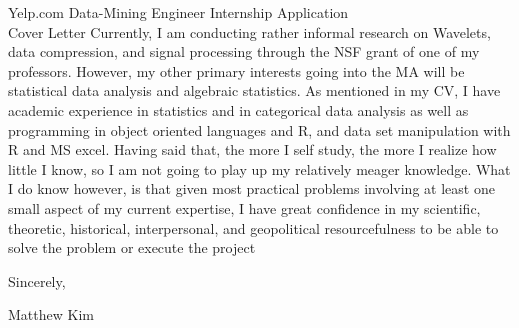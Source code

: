 \documentclass[11pt]{letter} %
\begin{document}
\begin{letter}{Yelp.com Data-Mining Engineer Internship Application\\
 Cover Letter}
Currently, I am conducting rather informal research on Wavelets, data compression, and signal processing through the NSF grant of one of my professors.  However, my other primary interests going into the MA will be statistical data analysis and algebraic statistics.  As mentioned in my CV, I have academic experience in statistics and in categorical data analysis as well as programming in object oriented languages and R, and data set manipulation with R and MS excel.   Having said that, the more I self study, the more I realize how little I know, so I am not going to play up my relatively meager knowledge.  What I do know however, is that given most practical problems involving at least one small aspect of my current expertise, I have great confidence in my scientific, theoretic, historical, interpersonal, and geopolitical resourcefulness to be able to solve the problem or execute the project 






   \closing{Sincerely,}
   Matthew Kim
 


\end{letter}
 
\end{document}

